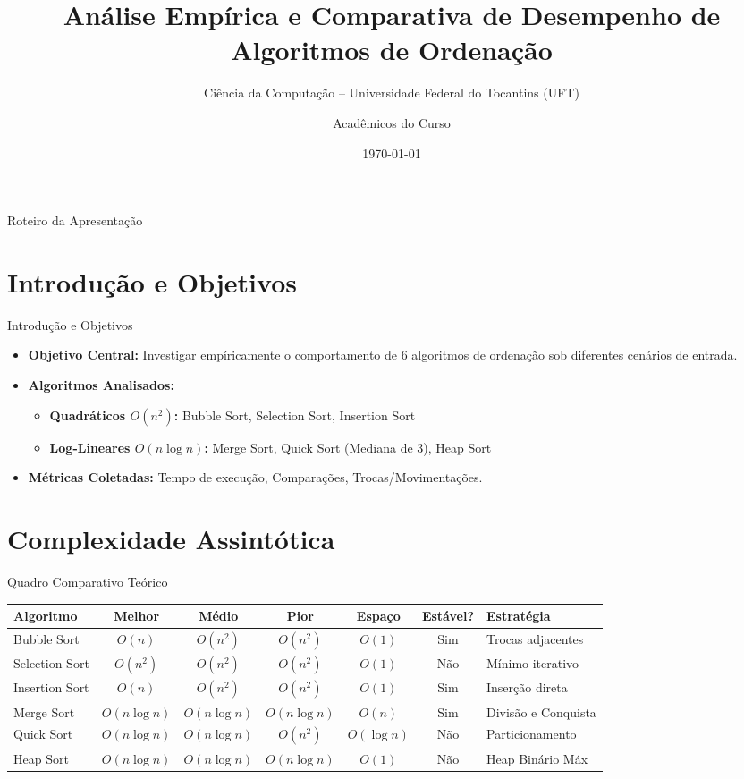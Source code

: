 \documentclass{beamer}
\title[Análise de Algoritmos de Ordenação]{Análise Empírica e Comparativa de Desempenho de Algoritmos de Ordenação}
\subtitle{Ciência da Computação -- Universidade Federal do Tocantins (UFT)}
\author{Acadêmicos do Curso}
\date{\today}
\begin{document}
\frame{\titlepage}

\begin{frame}{Roteiro da Apresentação}
    \tableofcontents
\end{frame}

\section{Introdução e Objetivos}
\begin{frame}{Introdução e Objetivos}
    \begin{itemize}
        \item \textbf{Objetivo Central:} Investigar empíricamente o comportamento de 6 algoritmos de ordenação sob diferentes cenários de entrada.
        \item \textbf{Algoritmos Analisados:}
            \begin{itemize}
                \item \textbf{Quadráticos $O(n^2)$:} Bubble Sort, Selection Sort, Insertion Sort
                \item \textbf{Log-Lineares $O(n \log n)$:} Merge Sort, Quick Sort (Mediana de 3), Heap Sort
            \end{itemize}
        \item \textbf{Métricas Coletadas:} Tempo de execução, Comparações, Trocas/Movimentações.
    \end{itemize}
\end{frame}

\section{Complexidade Assintótica}
\begin{frame}{Quadro Comparativo Teórico}
    \begin{table}[H]
    \centering
    \tiny
    \begin{tabular}{@{}lcccccl@{}}
    \toprule
    \textbf{Algoritmo} & \textbf{Melhor} & \textbf{Médio} & \textbf{Pior} & \textbf{Espaço} & \textbf{Estável?} & \textbf{Estratégia} \\ \midrule
    Bubble Sort & $O(n)$ & $O(n^2)$ & $O(n^2)$ & $O(1)$ & Sim & Trocas adjacentes \\
    Selection Sort & $O(n^2)$ & $O(n^2)$ & $O(n^2)$ & $O(1)$ & Não & Mínimo iterativo \\
    Insertion Sort & $O(n)$ & $O(n^2)$ & $O(n^2)$ & $O(1)$ & Sim & Inserção direta \\
    Merge Sort & $O(n \log n)$ & $O(n \log n)$ & $O(n \log n)$ & $O(n)$ & Sim & Divisão e Conquista \\
    Quick Sort & $O(n \log n)$ & $O(n \log n)$ & $O(n^2)$ & $O(\log n)$ & Não & Particionamento \\
    Heap Sort & $O(n \log n)$ & $O(n \log n)$ & $O(n \log n)$ & $O(1)$ & Não & Heap Binário Máx \\ \bottomrule
    \end{tabular}
    \end{table}
\end{frame}
\end{document}
